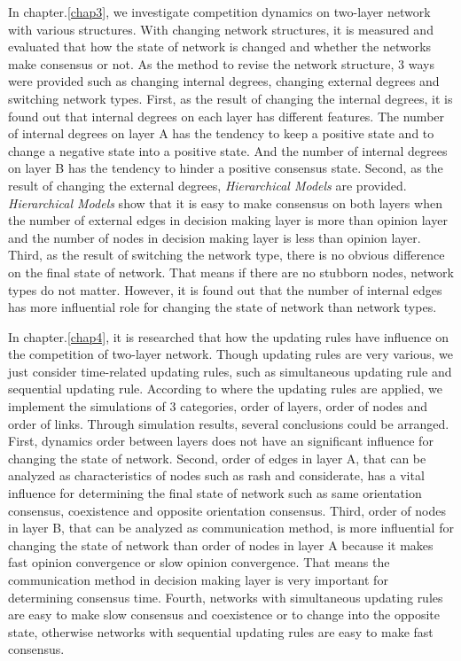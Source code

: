 In chapter.\ref{chap3}, we investigate competition dynamics on two-layer network with various structures. With changing network structures, it is measured and evaluated that how the state of network is changed and whether the networks make consensus or not. As the method to revise the network structure, $3$ ways were provided such as changing internal degrees, changing external degrees and switching network types. First, as the result of changing the internal degrees, it is found out that internal degrees on each layer has different features. The number of internal degrees on layer A has the tendency to keep a positive state and to change a negative state into a positive state. And the number of internal degrees on layer B has the tendency to hinder a positive consensus state. Second, as the result of changing the external degrees, \textit{Hierarchical Models} are provided. \textit{Hierarchical Models} show that it is easy to make consensus on both layers when the number of external edges in decision making layer is more than opinion layer and the number of nodes in decision making layer is less than opinion layer. Third, as the result of switching the network type, there is no obvious difference on the final state of network. That means if there are no stubborn nodes, network types do not matter. However, it is found out that the number of internal edges has more influential role for changing the state of network than network types.

In chapter.\ref{chap4}, it is researched that how the updating rules have influence on the competition of two-layer network. Though updating rules are very various, we just consider time-related updating rules, such as simultaneous updating rule and sequential updating rule. According to where the updating rules are applied, we implement the simulations of $3$ categories, order of layers, order of nodes and order of links. Through simulation results, several conclusions could be arranged. First, dynamics order between layers does not have an significant influence for changing the state of network. Second, order of edges in layer A, that can be analyzed as characteristics of nodes such as rash and considerate, has a vital influence for determining the final state of network such as same orientation consensus, coexistence and opposite orientation consensus. Third, order of nodes in layer B, that can be analyzed as communication method, is more influential for changing the state of network than order of nodes in layer A because it makes fast opinion convergence or slow opinion convergence. That means the communication method in decision making layer is very important for determining consensus time. Fourth, networks with simultaneous updating rules are easy to make slow consensus and coexistence or to change into the opposite state, otherwise networks with sequential updating rules are easy to make fast consensus.

